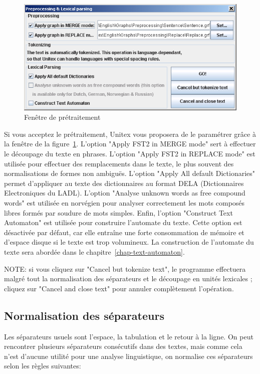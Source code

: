 \begin{figure}[!h]
\begin{center}
\includegraphics[width=15cm]{resources/img/fig2-9.png}
\caption{Fenêtre de prétraitement\label{fig-preprocessing-frame}}
\end{center}
\end{figure}

\bigskip
\noindent 
Si vous acceptez le prétraitement, Unitex vous proposera de le paramétrer grâce à la fenêtre de la
figure~\ref{fig-preprocessing-frame}. L’option "Apply FST2 in MERGE mode" sert à effectuer le
découpage du texte en phrases. L’option "Apply FST2 in REPLACE mode" est utilisée pour effectuer des
remplacements dans le texte, le plus souvent des normalisations de formes non ambiguës. L’option
"Apply All default Dictionaries" permet d’appliquer au texte des dictionnaires au format DELA
(Dictionnaires Electroniques du LADL).  L’option "Analyse unknown words as free 
compound words" est utilisée en norvégien pour analyser correctement les mots composés libres
formés par soudure de mots simples. Enfin, l’option "Construct Text Automaton" est utilisée
pour construire l’automate du texte. Cette option est désactivée par défaut, car elle entraîne
une forte consommation de mémoire et d’espace disque si le texte est trop volumineux. La
construction de l’automate du texte sera abordée dans le chapitre~\ref{chap-text-automaton}.

\bigskip
\noindent NOTE: si vous cliquez sur "Cancel but tokenize text", le programme effectuera malgré
tout la normalisation des séparateurs et le découpage en unités lexicales ; cliquez sur "Cancel
and close text" pour annuler complètement l’opération.


\subsection{Normalisation des séparateurs}
Les séparateurs usuels sont l’espace, la tabulation et le retour à la ligne. On peut rencontrer
plusieurs séparateurs consécutifs dans des textes, mais comme cela n’est d’aucune utilité
pour une analyse linguistique, on normalise ces séparateurs selon les règles suivantes:

